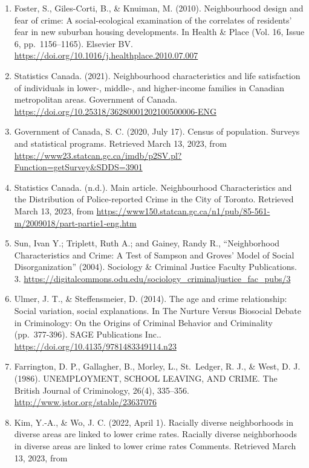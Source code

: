 \documentclass[
]{article}
\begin{document}
\begin{enumerate}
\def\labelenumi{\arabic{enumi}.}
\item
  Foster, S., Giles-Corti, B., \& Knuiman, M. (2010). Neighbourhood
  design and fear of crime: A social-ecological examination of the
  correlates of residents' fear in new suburban housing developments. In
  Health \& Place (Vol. 16, Issue 6, pp.~1156--1165). Elsevier BV.
  \url{https://doi.org/10.1016/j.healthplace.2010.07.007}
\item
  Statistics Canada. (2021). Neighbourhood characteristics and life
  satisfaction of individuals in lower-, middle-, and higher-income
  families in Canadian metropolitan areas. Government of Canada.
  \url{https://doi.org/10.25318/36280001202100500006-ENG}
\item
  Government of Canada, S. C. (2020, July 17). Census of population.
  Surveys and statistical programs. Retrieved March 13, 2023, from
  \url{https://www23.statcan.gc.ca/imdb/p2SV.pl?Function=getSurvey\&SDDS=3901}
\item
  Statistics Canada. (n.d.). Main article. Neighbourhood Characteristics
  and the Distribution of Police-reported Crime in the City of Toronto.
  Retrieved March 13, 2023, from
  \url{https://www150.statcan.gc.ca/n1/pub/85-561-m/2009018/part-partie1-eng.htm}
\item
  Sun, Ivan Y.; Triplett, Ruth A.; and Gainey, Randy R., ``Neighborhood
  Characteristics and Crime: A Test of Sampson and Groves' Model of
  Social Disorganization'' (2004). Sociology \& Criminal Justice Faculty
  Publications. 3.
  \url{https://digitalcommons.odu.edu/sociology_criminaljustice_fac_pubs/3}
\item
  Ulmer, J. T., \& Steffensmeier, D. (2014). The age and crime
  relationship: Social variation, social explanations. In The Nurture
  Versus Biosocial Debate in Criminology: On the Origins of Criminal
  Behavior and Criminality (pp.~377-396). SAGE Publications Inc..
  \url{https://doi.org/10.4135/9781483349114.n23}
\item
  Farrington, D. P., Gallagher, B., Morley, L., St.~Ledger, R. J., \&
  West, D. J. (1986). UNEMPLOYMENT, SCHOOL LEAVING, AND CRIME. The
  British Journal of Criminology, 26(4), 335--356.
  \url{http://www.jstor.org/stable/23637076}
\item
  Kim, Y.-A., \& Wo, J. C. (2022, April 1). Racially diverse
  neighborhoods in diverse areas are linked to lower crime rates.
  Racially diverse neighborhoods in diverse areas are linked to lower
  crime rates Comments. Retrieved March 13, 2023, from

\end{enumerate}
\end{document}
